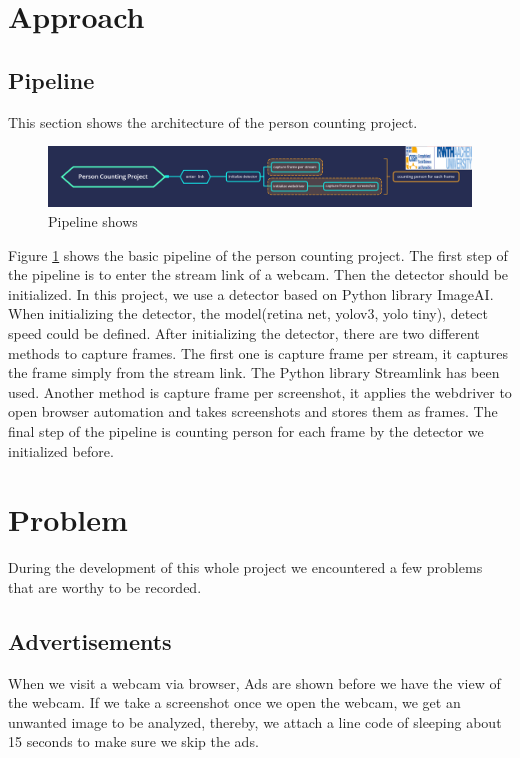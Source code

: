 \documentclass[runningheads]{llncs}
\begin{document}
\section{Approach}
\subsection{Pipeline}
This section shows the architecture of the person counting project.

\begin{figure}
\includegraphics[width=\textwidth]{figs/pipeline.png}
\caption{Pipeline shows } \label{fig1}
\end{figure}

 Figure \ref{fig1} shows the basic pipeline of the person counting project. The first step of the pipeline is to enter the stream link of a webcam. Then the detector should be initialized. In this project, we use a detector based on Python library ImageAI. When initializing the detector, the model(retina net, yolov3, yolo tiny), detect speed could be defined. After initializing the detector, there are two different methods to capture frames. The first one is capture frame per stream, it captures the frame simply from the stream link. The Python library Streamlink has been used. Another method is capture frame per screenshot, it applies the webdriver to open browser automation and takes screenshots and stores them as frames. The final step of the pipeline is counting person for each frame by the detector we initialized before.  


\section{Problem}
During the development of this whole project we encountered a few problems that are worthy to be recorded. 

\subsection{Advertisements}
When we visit a webcam via browser, Ads are shown before we have the view of the webcam. If we take a screenshot once we open the webcam, we get an unwanted image to be analyzed, thereby, we attach a line code of sleeping about 15 seconds to make sure we skip the ads.
\end{document}
